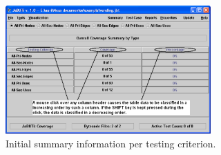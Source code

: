 \begin{figure}[!ht]
\begin{center}
\includegraphics[width=0.70\textwidth]{fig/summary-by-criterion-initial-edited}
\caption{\label{fig:initial-summary-criterion} Initial summary
information per testing criterion.}
\end{center}
\end{figure}
